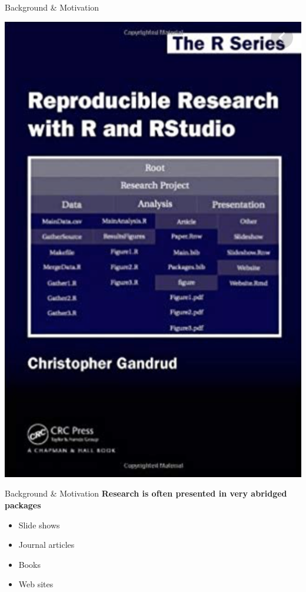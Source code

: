 \documentclass{beamer}\usepackage[]{graphicx}\usepackage[]{color}
\begin{document}
\begin{frame}{Background \& Motivation}
  \begin{center}
    \includegraphics[height=\textheight,keepaspectratio]{rr}
  \end{center}
\end{frame}

\begin{frame}[t]{Background \& Motivation}
  \textbf{Research is often presented in very abridged packages}
    \begin{itemize}
      \item Slide shows
      \item Journal articles
      \item Books
      \item Web sites
    \end{itemize}
\end{frame}
\end{document}
